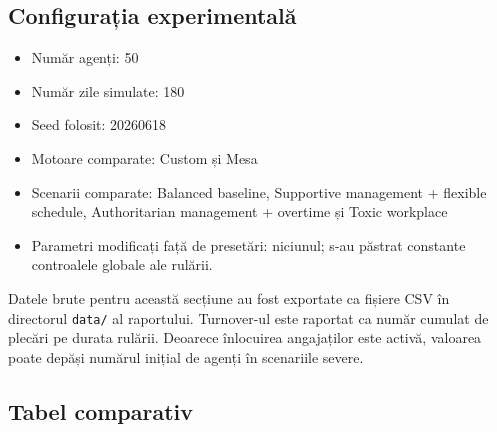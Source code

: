 \documentclass[12pt,a4paper]{article}
\begin{document}
\subsection{Configurația experimentală}

\begin{itemize}
    \item Număr agenți: 50
    \item Număr zile simulate: 180
    \item Seed folosit: 20260618
    \item Motoare comparate: Custom și Mesa
    \item Scenarii comparate: Balanced baseline, Supportive management + flexible schedule, Authoritarian management + overtime și Toxic workplace
    \item Parametri modificați față de presetări: niciunul; s-au păstrat constante controalele globale ale rulării.
\end{itemize}

Datele brute pentru această secțiune au fost exportate ca fișiere CSV în directorul \texttt{data/} al raportului. Turnover-ul este raportat ca număr cumulat de plecări pe durata rulării. Deoarece înlocuirea angajaților este activă, valoarea poate depăși numărul inițial de agenți în scenariile severe.

\subsection{Tabel comparativ}

\begin{table}[H]
    \centering
    \caption{Rezultate sintetice comparative obținute din simulările AWDS pentru 50 de agenți, 180 de zile și seed-ul 20260618.}
\end{table}
\end{document}
